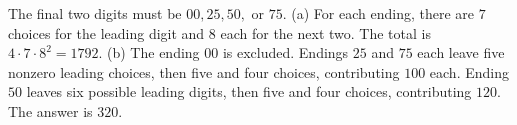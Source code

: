 The final two digits must be $00,25,50,$ or $75$. (a) For each ending, there are $7$ choices for the leading digit and $8$ each for the next two. The total is $4\cdot7\cdot8^2=\boxed{1792}$. (b) The ending $00$ is excluded. Endings $25$ and $75$ each leave five nonzero leading choices, then five and four choices, contributing $100$ each. Ending $50$ leaves six possible leading digits, then five and four choices, contributing $120$. The answer is $\boxed{320}$.
